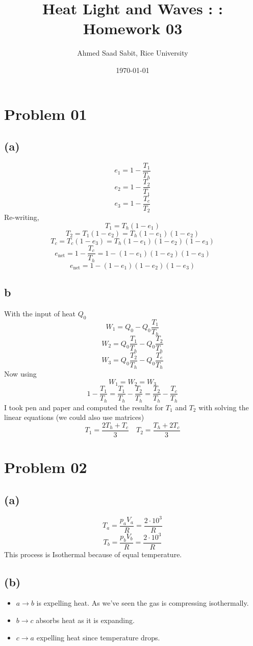\documentclass[letter]{article}
\title{Heat Light and Waves : : Homework 03}
\author{Ahmed Saad Sabit, Rice University}
\date{\today}
\begin{document}
\maketitle
\section*{Problem 01}
\subsection*{(a)} 
\[
	e_1 = 1 - \frac{T_1}{T_h}
\] 
\[
e_2 = 1 - \frac{T_2}{T_1}
\] 
\[
e_3 = 1 - \frac{T_c}{T_2}
\]
Re-writing, 
\[
T_1 = T_h (1- e_1)	
\]
\[
T_2 = T_1(1 - e_2) = T_h (1 - e_1) (1  - e_2)
\] 
\[
T_c = T_c(1 - e_3) = T_h (1- e_1) (1 - e_2) (1 - e_3)
\] 
\[
	e_{\text{net}} = 1 - \frac{T_c}{T_h} = 1 - (1- e_1) (1 - e_2) (1 - e_3)
\]
\[
\boxed{
	e_{\text{net}} = 1 - (1 - e_1) (1 - e_2) (1 - e_3)
}
\] 

\subsection*{b} 
With the input of heat $Q_0$ 
\[
W_1 = Q_0 - Q_0 \frac{T_1}{T_h}
\] 
\[
W_2 = Q_0 \frac{T_1}{T_h} - Q_0 \frac{T_2}{T_h}
\] 
\[
W_3 = Q_0 \frac{T_2}{T_h} - Q_0 \frac{T_c}{T_h}
\]
Now using
\[
W_1 = W_2 = W_3 
\] 
\[
	1 - \frac{T_1}{T_h} = \frac{T_1}{T_h} - \frac{T_2}{T_h} = \frac{T_2}{T_h} - \frac{T_c}{T_h} 
\]
I took pen and paper and computed the results for $T_1$ and $T_2$ with solving the linear equations (we could also use matrices) 
\[
\boxed{
T_1 = \frac{2 T_h + T_c}{3}
}\quad 
\boxed{ T_2 = 
\frac{T_h + 2 T_c}{ 3}
}
\] 


\section*{Problem 02} 
\subsection*{(a)}
\[
T_a = \frac{p_a V_a}{R} = \frac{2 \cdot 10^{3}}{R}
\] 
\[
T_b = \frac{p_b V_b}{R} = \frac{2 \cdot 10^{3}}{R}
\] 
This process is Isothermal because of equal temperature. 


\subsection*{(b)} 
\begin{itemize}
	\item $a \to b$ is expelling heat. As we've seen the gas is compressing isothermally. 
	\item $b\to c$ absorbs heat as it is expanding. 
	\item $c \to a$ expelling heat since temperature drops. 
\end{itemize}
\end{document}

